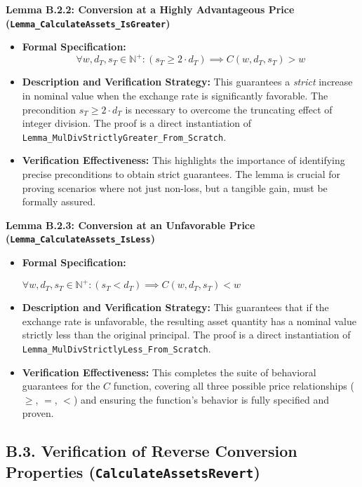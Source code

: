 \documentclass[
  english,
  onecolumn]{article}
\providecommand{\tightlist}{%
  \setlength{\itemsep}{0pt}\setlength{\parskip}{0pt}}
\begin{document}
\textbf{Lemma B.2.2: Conversion at a Highly Advantageous Price
(\texttt{Lemma\_CalculateAssets\_IsGreater})}

\begin{itemize}
\tightlist
\item
  \textbf{Formal Specification:}
  \[ \forall w, d_T, s_T \in \mathbb{N}^+ : (s_T \ge 2 \cdot d_T) \implies C(w, d_T, s_T) > w \]
\item
  \textbf{Description and Verification Strategy:} This guarantees a
  \emph{strict} increase in nominal value when the exchange rate is
  significantly favorable. The precondition \(s_T \ge 2 \cdot d_T\) is
  necessary to overcome the truncating effect of integer division. The
  proof is a direct instantiation of
  \texttt{Lemma\_MulDivStrictlyGreater\_From\_Scratch}.
\item
  \textbf{Verification Effectiveness:} This highlights the importance of
  identifying precise preconditions to obtain strict guarantees. The
  lemma is crucial for proving scenarios where not just non-loss, but a
  tangible gain, must be formally assured.
\end{itemize}

\textbf{Lemma B.2.3: Conversion at an Unfavorable Price
(\texttt{Lemma\_CalculateAssets\_IsLess})}

\begin{itemize}
\item
  \textbf{Formal Specification:}

  \(\forall w, d_T, s_T \in \mathbb{N}^+ : (s_T < d_T) \implies C(w, d_T, s_T) < w\)
\item
  \textbf{Description and Verification Strategy:} This guarantees that
  if the exchange rate is unfavorable, the resulting asset quantity has
  a nominal value strictly less than the original principal. The proof
  is a direct instantiation of
  \texttt{Lemma\_MulDivStrictlyLess\_From\_Scratch}.
\item
  \textbf{Verification Effectiveness:} This completes the suite of
  behavioral guarantees for the \(C\) function, covering all three
  possible price relationships (\(\ge\), \(=\), \(<\)) and ensuring the
  function's behavior is fully specified and proven.
\end{itemize}

\subsection{\texorpdfstring{B.3. Verification of Reverse Conversion
Properties
(\texttt{CalculateAssetsRevert})}{B.3. Verification of Reverse Conversion Properties (CalculateAssetsRevert)}}\label{b.3.-verification-of-reverse-conversion-properties-calculateassetsrevert}
\end{document}
